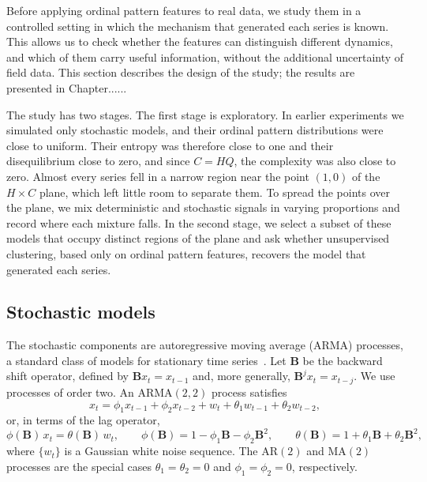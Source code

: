 Before applying ordinal pattern features to real data, we study them in a controlled setting in which the mechanism that generated each series is known. This allows us to check whether the features can distinguish different dynamics, and which of them carry useful information, without the additional uncertainty of field data. This section describes the design of the study; the results are presented in Chapter......

The study has two stages. The first stage is exploratory. In earlier experiments we simulated only stochastic models, and their ordinal pattern distributions were close to uniform. Their entropy was therefore close to one and their disequilibrium close to zero, and since $C=HQ$, the complexity was also close to zero. Almost every series fell in a narrow region near the point $(1,0)$ of the $H\times C$ plane, which left little room to separate them. To spread the points over the plane, we mix deterministic and stochastic signals in varying proportions and record where each mixture falls. In the second stage, we select a subset of these models that occupy distinct regions of the plane and ask whether unsupervised clustering, based only on ordinal pattern features, recovers the model that generated each series.

\subsection{Stochastic models}\label{Subsec:SimStochastic}

The stochastic components are autoregressive moving average (ARMA) processes, a standard class of models for stationary time series~\cite{ShumwayStoffer2017}. Let $\mathbf{B}$ be the backward shift operator, defined by $\mathbf{B}x_t=x_{t-1}$ and, more generally, $\mathbf{B}^j x_t=x_{t-j}$. We use processes of order two. An ARMA$(2,2)$ process satisfies
\begin{equation}
	x_t=\phi_1x_{t-1}+\phi_2x_{t-2}+w_t+\theta_1w_{t-1}+\theta_2w_{t-2},
	\label{eq:ARMA22}
\end{equation}
or, in terms of the lag operator,
\[
\phi(\mathbf{B})\,x_t=\theta(\mathbf{B})\,w_t,
\qquad
\phi(\mathbf{B})=1-\phi_1\mathbf{B}-\phi_2\mathbf{B}^2,
\qquad
\theta(\mathbf{B})=1+\theta_1\mathbf{B}+\theta_2\mathbf{B}^2,
\]
where $\{w_t\}$ is a Gaussian white noise sequence. The AR$(2)$ and MA$(2)$ processes are the special cases $\theta_1=\theta_2=0$ and $\phi_1=\phi_2=0$, respectively.

